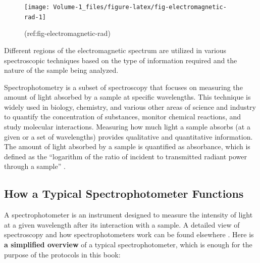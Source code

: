 \documentclass[
  9pt,
  american,
  a5paper,
  extrafontsizes,onecolumn,openright
  ]{memoir}
\begin{document}
\scriptsize

\begin{figure}

{\centering \texttt{[image: Volume-1\_files/figure-latex/fig-electromagnetic-rad-1]} 

}

\caption{(ref:fig-electromagnetic-rad)}\label{fig:fig-electromagnetic-rad}
\end{figure}

\normalsize

Different regions of the electromagnetic spectrum are utilized in various spectroscopic techniques based on the type of information required and the nature of the sample being analyzed.

Spectrophotometry is a subset of spectroscopy that focuses on measuring the amount of light absorbed by a sample at specific wavelengths. This technique is widely used in biology, chemistry, and various other areas of science and industry to quantify the concentration of substances, monitor chemical reactions, and study molecular interactions. Measuring how much light a sample absorbs (at a given or a set of wavelengths) provides qualitative and quantitative information. The amount of light absorbed by a sample is quantified as absorbance, which is defined as the \enquote{logarithm of the ratio of incident to transmitted radiant power through a sample} \autocite{gold_iupac_2019}.

\subsection{How a Typical Spectrophotometer Functions}\label{how-a-typical-spectrophotometer-functions}

A spectrophotometer is an instrument designed to measure the intensity of light at a given wavelength after its interaction with a sample. A detailed view of spectroscopy and how spectrophotometers work can be found elsewhere \autocite{skoog_fundamentals_2022}. Here is \textbf{a simplified overview} of a typical spectrophotometer, which is enough for the purpose of the protocols in this book:
\end{document}

